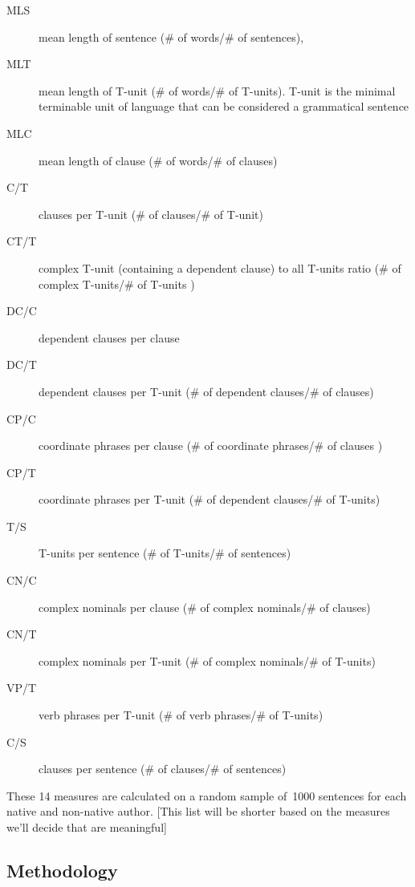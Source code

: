 \documentclass[11pt]{article}
\newcommand{\note}[1]{\textit{\small\color{magenta}{#1}}}
\begin{document}
\begin{description}
\item[MLS] mean length of sentence (\# of words/\# of sentences), 
\item[MLT] mean length of T-unit (\# of words/\# of T-units). T-unit is the minimal terminable unit of language that can be considered a grammatical sentence 
\item[MLC] mean length of clause (\# of words/\# of clauses)
\item[C/T] clauses per T-unit (\# of clauses/\# of T-unit)
\item[CT/T] complex T-unit (containing a dependent clause) to all T-units ratio (\# of complex T-units/\# of T-units )
\item[DC/C] dependent clauses per clause
\item[DC/T] dependent clauses per T-unit (\# of dependent clauses/\# of clauses)
\item[CP/C] coordinate phrases per clause (\# of coordinate phrases/\# of clauses )
\item[CP/T] coordinate phrases per T-unit (\# of dependent clauses/\# of T-units)
\item[T/S] T-units per sentence (\# of T-units/\# of sentences)
\item[CN/C] complex nominals per clause (\# of complex nominals/\# of clauses)
\item[CN/T]  complex nominals per T-unit (\# of complex nominals/\# of T-units)
\item[VP/T] verb phrases per T-unit (\# of verb phrases/\# of T-units)
\item[C/S] clauses per sentence (\# of clauses/\# of sentences)
\end{description}

These 14 measures are calculated on a random sample of~1000 sentences for each native and non-native author. 
[This list will be shorter based on the measures we’ll decide that are meaningful]


\subsection{Methodology}

\note{This is still too vague. Recall the research hypothesis and try to first explain, in simple non-technical terms, how your planned work is going to address and answer it. In particular, say something about Romance vs.\ Germanic, it is not at all clear from the current presentation.}
\end{document}

